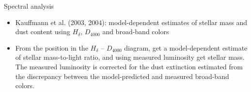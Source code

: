 \documentclass[letterpaper,landscape]{slides}
\begin{document}
\begin{slide}
{\begin{minipage}[t]{15cm}
\begin{center}
{\large \color{red} Spectral analysis}
\end{center}

\begin{itemize}
\item
Kauffmann et al. (2003, 2004): model-dependent estimates of {\color{blue} 
stellar mass and dust content using $H_\delta$, $D_{4000}$ and broad-band colors}
\item
{\color{red} From the position in the $H_\delta$ -- $D_{4000}$ diagram, get a model-dependent 
estimate of stellar mass-to-light ratio, and using measured luminosity get stellar
mass.} The measured luminosity is corrected for the dust extinction estimated from 
the discrepancy between the model-predicted and measured broad-band colors.
\end{itemize}  

\end{minipage}}
\vfill 
\end{slide}
\end{document}
